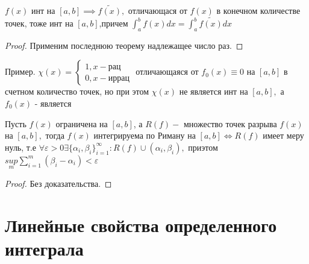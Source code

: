 \documentclass[../main.tex]{subfiles}
\begin{document}
\begin{corollary}
    $f(x)$ инт на $[a,b]\implies \tilde{f(x)},$ отличающася от $f(x)$ в конечном количестве точек, тоже инт на $[a,b]$,причем $\int _{a}^{b}f(x)dx=\int _{a}^{b}\tilde{f(x)}dx$
\end{corollary}
\begin{proof}
    Применим последнюю теорему надлежащее число раз.
\end{proof}
Пример. $\chi(x)=\begin{cases}
    1,x-\text{рац}\\ 
    0,x-\text{иррац}
\end{cases}$ отличающаяся от $f_{0}(x)\equiv 0$ на $[a,b]$ в счетном количество точек, но при этом $\chi(x) $ не является инт на $[a,b],$ а $f_{0}(x)$ - является
\begin{theorem} 
    Пусть $f(x)$ ограничена на $[a,b]$, а $R(f)-$ множество точек разрыва $f(x)$ на $[a,b],$ тогда $f(x)$ интегрируема по Риману на $[a,b] \Leftrightarrow R(f)$ имеет меру нуль, т.е $\forall \varepsilon>0 \exists \{\alpha_{i},\beta_{i}\}_{i=1}^{\infty}:R(f) \cup(\alpha_{i},\beta_{i}),$ приэтом $\underset{m}{sup} \sum_{i=1}^{m}(\beta_{i}-\alpha_{i})<\varepsilon$
\end{theorem}
\begin{proof}
    Без доказательства.
\end{proof}
\section{Линейные свойства определенного интеграла}
\end{document}
